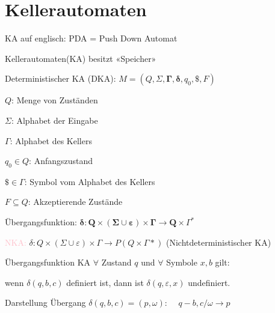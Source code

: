 \graphicspath{{images/}}
\section*{Kellerautomaten}

\begin{remark}
    KA auf englisch: PDA = Push Down Automat
\end{remark}

\begin{definition}{Kellerautomaten}(KA) besitzt «Speicher»

    Deterministischer KA (DKA): $M=\left(Q, \Sigma, \boldsymbol{\Gamma}, \boldsymbol{\delta}, q_{0}, \$, F\right)$
    
    \begin{minipage}{0.4\linewidth}
        $Q$: Menge von Zuständen

        $\Sigma$: Alphabet der Eingabe

        $\Gamma$: Alphabet des Kellers
    \end{minipage}
    \begin{minipage}{0.6\linewidth}
        $q_{0} \in Q$: Anfangszustand

        $\$ \in \Gamma$: Symbol vom Alphabet des Kellers

        $F \subseteq Q$: Akzeptierende Zustände
    \end{minipage}

    Übergangsfunktion: $\boldsymbol{\delta}: \boldsymbol{Q} \times(\boldsymbol{\Sigma} \cup \boldsymbol{\varepsilon}) \times \boldsymbol{\Gamma} \rightarrow \boldsymbol{Q} \times \Gamma^{*}$

    \vspace{1mm}

    \textcolor{pink}{NKA:} $\delta: Q \times(\Sigma \cup \varepsilon) \times \Gamma \rightarrow P(Q \times \Gamma *)$ (Nichtdeterministischer KA)
\end{definition}

\begin{concept}{Übergangsfunktion KA}
    $\forall$ Zustand $q$ und $\forall$ Symbole $x, b$ gilt:
    
    wenn $\delta(q, b, c)$ definiert ist, dann ist $\delta(q, \varepsilon, x)$ undefiniert.

    \vspace*{1mm}

    Darstellung Übergang $\delta(q, b, c)=(p, \omega)$: \emph{$\quad q -b, c / \omega \longrightarrow p$}
\end{concept}

